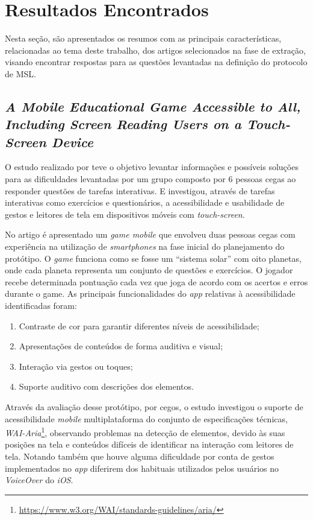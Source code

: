 \newpage{}

\section{Resultados Encontrados}

Nesta seção, são apresentados os resumos com as principais características, relacionadas ao tema deste trabalho, dos artigos selecionados na fase de extração, visando encontrar respostas para as questões levantadas na definição do protocolo de MSL\@.

\subsection{\emph{A Mobile Educational Game Accessible to All, Including Screen Reading Users on a Touch-Screen Device}}

O estudo realizado por  teve o objetivo levantar informações e possíveis soluções para as dificuldades levantadas por um grupo composto por 6 pessoas cegas ao responder questões de tarefas interativas.
E investigou, através de tarefas interativas como exercícios e questionários, a acessibilidade e usabilidade de gestos e leitores de tela em dispositivos móveis com \emph{touch-screen}.

No artigo é apresentado um \emph{game mobile} que envolveu duas pessoas cegas com experiência na utilização de \emph{smartphones} na fase inicial do planejamento do protótipo.
O \emph{game} funciona como se fosse um ``sistema solar'' com oito planetas, onde cada planeta representa um conjunto de questões e exercícios.
O jogador recebe determinada pontuação cada vez que joga de acordo com os acertos e erros durante o game.
As principais funcionalidades do \emph{app} relativas à acessibilidade identificadas foram:

\begin{enumerate}
\item Contraste de cor para garantir diferentes níveis de acessibilidade;
\item Apresentações de conteúdos de forma auditiva e visual;
\item Interação via gestos ou toques;
\item Suporte auditivo com descrições dos elementos.
\end{enumerate}

Através da avaliação desse protótipo, por cegos, o estudo investigou o suporte de acessibilidade \emph{mobile} multiplataforma do conjunto de especificações técnicas, \emph{WAI-Aria}\footnote{\url{https://www.w3.org/WAI/standards-guidelines/aria/}}, observando problemas na detecção de elementos, devido às suas posições na tela e conteúdos difíceis de identificar na interação com leitores de tela.
Notando também que houve alguma dificuldade por conta de gestos implementados no \emph{app} diferirem dos habituais utilizados pelos usuários no \emph{VoiceOver} do \emph{iOS}.

